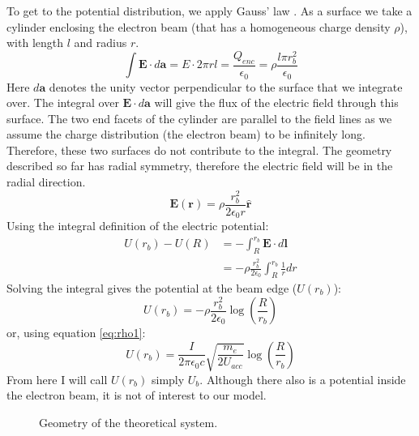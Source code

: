 To get to the potential distribution, we apply Gauss' law \cite{GriffithsEM}. As a surface we take a cylinder enclosing the electron beam (that has a homogeneous charge density $\rho$), with length $l$ and radius $r$.
\begin{equation}
\int\textbf{E}\cdot d\mathbf{a} = E\cdot2\pi r l = \frac{Q_{enc}}{\epsilon_0} = \rho \frac{l\pi r_b^2}{\epsilon_0}
\end{equation}
Here $d\mathbf{a}$ denotes the unity vector perpendicular to the surface that we integrate over. The integral over $\textbf{E}\cdot d\mathbf{a}$ will give the flux of the electric field through this surface. 
The two end facets of the cylinder are parallel to the field lines as we assume the charge distribution (the electron beam) to be infinitely long. Therefore, these two surfaces do not contribute to the integral.
The geometry described so far has radial symmetry, therefore the electric field will be in the radial direction.
\begin{equation}
\mathbf{E}(\mathbf{r}) = \rho \frac{r_b^2}{2\epsilon_0r}\hat{\mathbf{r}}
\end{equation}
Using the integral definition of the electric potential:
\begin{align}
U(r_b)-U(R) &= -\int_R^{r_b} \mathbf{E}\cdot d\mathbf{l} \nonumber \\
&= - \rho \frac{r_b^2}{2\epsilon_0}  \int_R^{r_b} \frac{1}{r} dr
\end{align}
Solving the integral gives the potential at the beam edge ($U(r_b)$):
\begin{equation}
\label{eq:vbeamrho}
U(r_b) = - \rho \frac{r_b^2}{2\epsilon_0} \log\left(\frac{R}{r_b}\right)
\end{equation}
or, using equation \ref{eq:rho1}:
\begin{equation}
\label{eq:vbeamI}
U(r_b)=\frac{I}{2\pi\epsilon_0 c}\sqrt{\frac{m_e}{2U_{acc}}}\log\left(\frac{R}{r_b}\right)
\end{equation}
From here I will call $U(r_b)$ simply $U_b$. Although there also is a potential inside the electron beam, it is not of interest to our model.

\begin{figure}[h]
\centering

\caption{Geometry of the theoretical system.}
\label{fig:theorygeometry}
\end{figure}

